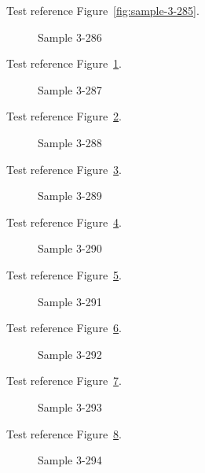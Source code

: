 Test reference Figure~\ref{fig:sample-3-285}.

\begin{figure}[tbhp]
\caption{Sample 3-286}
\label{fig:sample-3-286}
\end{figure}

Test reference Figure~\ref{fig:sample-3-286}.

\begin{figure}[tbhp]
\caption{Sample 3-287}
\label{fig:sample-3-287}
\end{figure}

Test reference Figure~\ref{fig:sample-3-287}.

\begin{figure}[tbhp]
\caption{Sample 3-288}
\label{fig:sample-3-288}
\end{figure}

Test reference Figure~\ref{fig:sample-3-288}.

\begin{figure}[tbhp]
\caption{Sample 3-289}
\label{fig:sample-3-289}
\end{figure}

Test reference Figure~\ref{fig:sample-3-289}.

\begin{figure}[tbhp]
\caption{Sample 3-290}
\label{fig:sample-3-290}
\end{figure}

Test reference Figure~\ref{fig:sample-3-290}.

\begin{figure}[tbhp]
\caption{Sample 3-291}
\label{fig:sample-3-291}
\end{figure}

Test reference Figure~\ref{fig:sample-3-291}.

\begin{figure}[tbhp]
\caption{Sample 3-292}
\label{fig:sample-3-292}
\end{figure}

Test reference Figure~\ref{fig:sample-3-292}.

\begin{figure}[tbhp]
\caption{Sample 3-293}
\label{fig:sample-3-293}
\end{figure}

Test reference Figure~\ref{fig:sample-3-293}.

\begin{figure}[tbhp]
\caption{Sample 3-294}
\label{fig:sample-3-294}
\end{figure}

